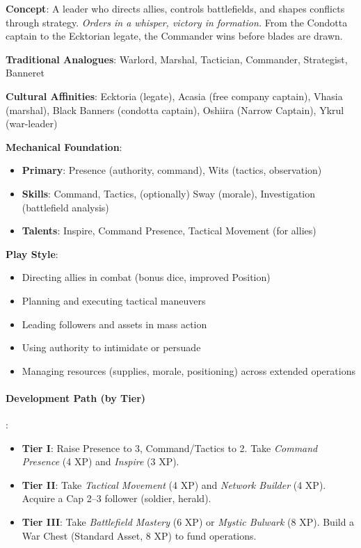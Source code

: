 \textbf{Concept}: A leader who directs allies, controls battlefields, and shapes conflicts through strategy. \emph{Orders in a whisper, victory in formation.} From the Condotta captain to the Ecktorian legate, the Commander wins before blades are drawn.

\textbf{Traditional Analogues}: Warlord, Marshal, Tactician, Commander, Strategist, Banneret

\textbf{Cultural Affinities}: Ecktoria (legate), Acasia (free company captain), Vhasia (marshal), Black Banners (condotta captain), Oshiira (Narrow Captain), Ykrul (war-leader)

\textbf{Mechanical Foundation}:
\begin{itemize}
\item \textbf{Primary}: Presence (authority, command), Wits (tactics, observation)
\item \textbf{Skills}: Command, Tactics, (optionally) Sway (morale), Investigation (battlefield analysis)
\item \textbf{Talents}: Inspire, Command Presence, Tactical Movement (for allies)
\end{itemize}

\textbf{Play Style}:
\begin{itemize}
\item Directing allies in combat (bonus dice, improved Position)
\item Planning and executing tactical maneuvers
\item Leading followers and assets in mass action
\item Using authority to intimidate or persuade
\item Managing resources (supplies, morale, positioning) across extended operations
\end{itemize}

\paragraph{Development Path (by Tier)}:
\begin{itemize}
\item \textbf{Tier I}: Raise Presence to 3, Command/Tactics to 2. Take \emph{Command Presence} (4 XP) and \emph{Inspire} (3 XP).
\item \textbf{Tier II}: Take \emph{Tactical Movement} (4 XP) and \emph{Network Builder} (4 XP). Acquire a Cap 2--3 follower (soldier, herald).
\item \textbf{Tier III}: Take \emph{Battlefield Mastery} (6 XP) or \emph{Mystic Bulwark} (8 XP). Build a War Chest (Standard Asset, 8 XP) to fund operations.
\end{itemize}

